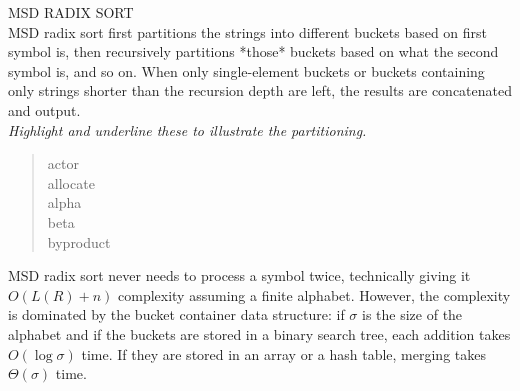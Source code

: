 {\sffamily\normalsize{\color{sciorange} MSD RADIX SORT}}\vspace{1mm}\\
\footnotesize 
MSD radix sort first partitions the strings into different buckets based on
first symbol is, then recursively partitions *those* buckets based on what
the second symbol is, and so on.  When only single-element buckets or buckets
containing only strings shorter than the recursion depth are left, the results
are concatenated and output.\\

{\em Highlight and underline these to illustrate the partitioning.}
\begin{quote}
    {\color{green}a}ctor\\
    {\color{sciorange}al}locate\\
    {\color{sciorange}al}pha\\
    {\color{red}b}eta\\
    {\color{red}b}yproduct\\
\end{quote}
MSD radix sort never needs to process a symbol twice, technically giving it
$O(L(R) + n)$ complexity assuming a finite alphabet.  However, the complexity
is dominated by the bucket container data structure: if $\sigma$ is the size of the
alphabet and if the buckets are stored in a binary search tree, each addition
takes $O(\log \sigma)$ time.  If they are stored in an array or a hash table, merging
takes $\Theta(\sigma)$ time.